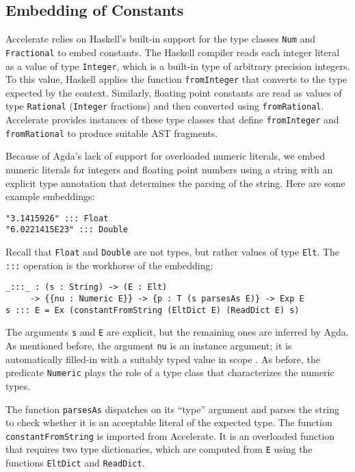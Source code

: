 \documentclass{llncs}
\begin{document}
\subsection{Embedding of Constants}
\label{sec:embedding-constants}

Accelerate relies on Haskell's built-in support for the type classes
\texttt{Num} and \texttt{Fractional} to embed constants. The Haskell
compiler reads each integer literal as a value of type
\texttt{Integer}, which is a built-in type of arbitrary precision
integers. To this value, Haskell applies the function
\texttt{fromInteger} that converts to the type expected by the
context. Similarly, floating point constants are read as values of
type \texttt{Rational} (\texttt{Integer} fractions) and then converted
using \texttt{fromRational}. Accelerate provides instances of these
type classes that define \texttt{fromInteger} and
\texttt{fromRational} to produce suitable AST fragments.

Because of Agda's lack of support for overloaded numeric literals,
we embed numeric literals for integers and floating point numbers
using a string with an explicit type annotation that determines the
parsing of the string. Here are some example embeddings:
\begin{verbatim}
"3.1415926" ::: Float
"6.0221415E23" ::: Double
\end{verbatim}
Recall that \texttt{Float} and \texttt{Double} are not
types, but rather values of type \texttt{Elt}.
The \texttt{:::} operation is the workhorse of the embedding:
\begin{verbatim}
_:::_ : (s : String) -> (E : Elt) 
     -> {{nu : Numeric E}} -> {p : T (s parsesAs E)} -> Exp E
s ::: E = Ex (constantFromString (EltDict E) (ReadDict E) s)
\end{verbatim}
The arguments \texttt{s} and \texttt{E} are explicit, but the
remaining ones are inferred by Agda.
As mentioned before, the argument \texttt{nu} is an instance argument; it is automatically
filled-in with a suitably typed value in scope
\cite{DevriesePiessens2011}. As before, the predicate 
\texttt{Numeric} plays the role of a type class that characterizes
the numeric types.

The function \texttt{parsesAs} dispatches on its ``type'' argument and
parses the string to check whether it is an acceptable literal of the expected type. The
function \texttt{constantFromString} is imported from Accelerate.
It is an overloaded function that requires two type dictionaries,
which are computed from \texttt{E} using the functions \texttt{EltDict}
and \texttt{ReadDict}. 
\end{document}
